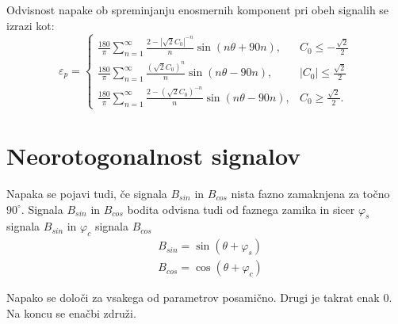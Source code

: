 Odvisnost napake ob spreminjanju enosmernih komponent pri obeh signalih se izrazi kot:
\begin{equation}
\label{vrsta_sincosoff}
\varepsilon_p=
\begin{cases}
\frac{180}{\pi}\sum_{n=1}^{\infty}\frac{2-|\sqrt{2}C_0|^{-n}}{n} \sin (n \theta + 90 n), & C_0\leq -\frac{\sqrt{2}}{2} \\
\frac{180}{\pi}\sum_{n=1}^{\infty}\frac{(\sqrt{2}C_0)^n}{n} \sin (n \theta - 90 n), & |C_0|\leq \frac{\sqrt{2}}{2} \\
\frac{180}{\pi}\sum_{n=1}^{\infty}\frac{2-(\sqrt{2}C_0)^{-n}}{n} \sin (n \theta - 90 n), & C_0\geq \frac{\sqrt{2}}{2}.
\end{cases}
\end{equation}

\section{Neorotogonalnost signalov}
Napaka se pojavi tudi, če signala $B_{sin}$ in $B_{cos}$ nista fazno zamaknjena za točno $90^\circ$. Signala $B_{sin}$ in $B_{cos}$ bodita odvisna tudi od faznega zamika in sicer
$\varphi_{s}$ signala $B_{sin}$ in $\varphi_{c}$ signala $B_{cos}$
\begin{eqnarray}
\label{equ:def_sin_fis}
&B_{sin} = \sin(\theta + \varphi_{s})\\
\label{equ:def_cos_fis}
&B_{cos} =\cos(\theta+\varphi_{c})
\end{eqnarray}

Napako se določi za vsakega od parametrov posamično. Drugi je takrat enak 0. Na koncu se enačbi združi.

